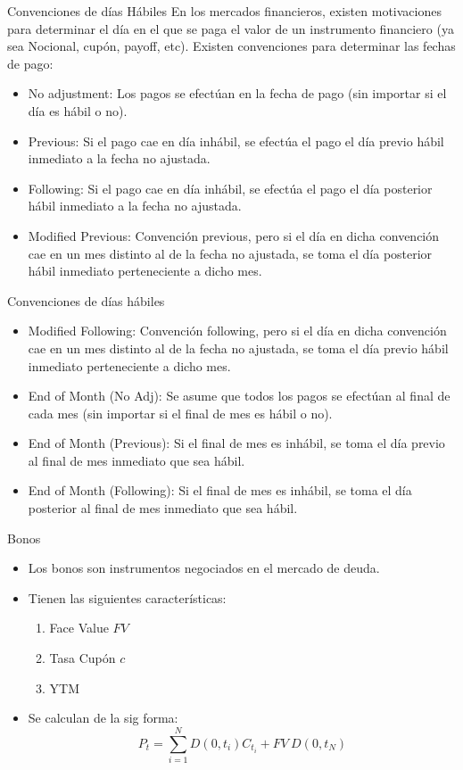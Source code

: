 \documentclass[11pt]{beamer}
\begin{document}
\begin{frame}{Convenciones de días Hábiles}
	En los mercados financieros, existen motivaciones para determinar el día en el que se paga el valor de un instrumento financiero (ya sea Nocional, cupón, payoff, etc). Existen convenciones para determinar las fechas de pago:
	\begin{itemize}
		\item No adjustment: Los pagos se efectúan en la fecha de pago (sin importar si el día es hábil o no).\medskip
		\item Previous: Si el pago cae en día inhábil, se efectúa el pago el día previo hábil inmediato a la fecha no ajustada. 
		\item Following: Si el pago cae en día inhábil, se efectúa el pago el día posterior hábil inmediato a la fecha no ajustada.\medskip
		\item Modified Previous: Convención previous, pero si el día en dicha convención cae en un mes distinto al de la fecha no ajustada, se toma el día posterior hábil inmediato perteneciente a dicho mes.
		

	\end{itemize}

\end{frame}


\begin{frame}{Convenciones de días hábiles}
	\begin{itemize}
		\item Modified Following: Convención following, pero si el día en dicha convención cae en un mes distinto al de la fecha no ajustada, se toma el día previo hábil inmediato perteneciente a dicho mes.\medskip
		\item End of Month (No Adj): Se asume que todos los pagos se efectúan al final de cada mes (sin importar si el final de mes es hábil o no).\medskip
		\item End of Month (Previous): Si el final de mes es inhábil, se toma el día previo al final de mes inmediato que sea hábil.\medskip
		\item End of Month (Following): Si el final de mes es inhábil, se toma el día posterior al final de mes inmediato que sea hábil.
	\end{itemize}
\end{frame}

\begin{frame}{Bonos}
\begin{itemize}
	\item Los bonos son instrumentos negociados en el mercado de deuda.
	\item Tienen las siguientes características:
	\begin{enumerate}
		\item Face Value $FV$
		\item Tasa Cupón $c$
		\item YTM
	\end{enumerate}
	\item Se calculan de la sig forma:
	\begin{equation}
	P_t=\sum_{i=1}^{N}D(0,t_i)C_{t_i}+FV \ D(0,t_N)
	\end{equation}
\end{itemize}
\end{frame}
\end{document}
